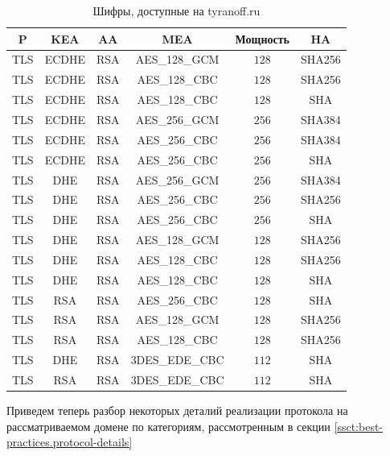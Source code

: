 \begin{table}[H]
    \centering
    \begin{tabular}{c|c|c|c|c|c}
        \textbf{P} & \textbf{KEA} & \textbf{AA} & \textbf{MEA} & \textbf{Мощность} & \textbf{HA} \\ 
        \hline
        TLS & ECDHE & RSA & AES\_128\_GCM & $128$ & SHA256 \\
        TLS & ECDHE & RSA & AES\_128\_CBC & $128$ & SHA256 \\
        TLS & ECDHE & RSA & AES\_128\_CBC & $128$ & SHA \\
        TLS & ECDHE & RSA & AES\_256\_GCM & $256$ & SHA384 \\
        TLS & ECDHE & RSA & AES\_256\_CBC & $256$ & SHA384 \\
        TLS & ECDHE & RSA & AES\_256\_CBC & $256$ & SHA \\
        TLS & DHE & RSA & AES\_256\_GCM & $256$ & SHA384 \\
        TLS & DHE & RSA & AES\_256\_CBC & $256$ & SHA256 \\
        TLS & DHE & RSA & AES\_256\_CBC & $256$ & SHA \\
        TLS & DHE & RSA & AES\_128\_GCM & $128$ & SHA256 \\
        TLS & DHE & RSA & AES\_128\_CBC & $128$ & SHA256 \\
        TLS & DHE & RSA & AES\_128\_CBC & $128$ & SHA \\
        TLS & RSA & RSA & AES\_256\_CBC & $128$ & SHA \\
        TLS & RSA & RSA & AES\_128\_GCM & $128$ & SHA256 \\
        TLS & RSA & RSA & AES\_128\_CBC & $128$ & SHA256 \\
        TLS & DHE & RSA & 3DES\_EDE\_CBC & $112$ & SHA \\
        TLS & RSA & RSA & 3DES\_EDE\_CBC & $112$ & SHA \\
    \end{tabular}
    \caption{Шифры, доступные на tyranoff.ru}
    \label{tbl:02-cipher-suits}
\end{table}

Приведем теперь разбор некоторых деталий реализации протокола на рассматриваемом домене по категориям, рассмотренным в секции 
\ref{ssct:best-practices.protocol-details}

